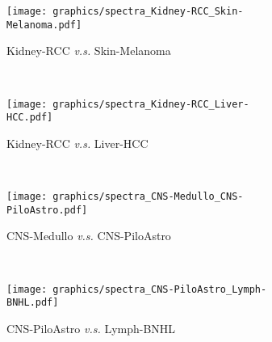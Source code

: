 \begin{figure}[ht!]
    \begin{subfigure}{.5\textwidth}
    \texttt{[image: graphics/spectra\_Kidney-RCC\_Skin-Melanoma.pdf]}
    \caption{Kidney-RCC \textit{v.s.} Skin-Melanoma}
    \label{fig:spectra_kidney_skin}
    \end{subfigure}
    ~
    \begin{subfigure}{.5\textwidth}
    \texttt{[image: graphics/spectra\_Kidney-RCC\_Liver-HCC.pdf]}
    \caption{Kidney-RCC \textit{v.s.} Liver-HCC}
    \label{fig:spectra_kidney_liver}
    \end{subfigure} \\
    \vspace{0.5cm}
    
    \begin{subfigure}{.5\textwidth}
    \texttt{[image: graphics/spectra\_CNS-Medullo\_CNS-PiloAstro.pdf]}
    \caption{CNS-Medullo \textit{v.s.} CNS-PiloAstro}
    \label{fig:spectra_medullo_piloastro}
    \end{subfigure}
    ~
    \begin{subfigure}{.5\textwidth}
    \texttt{[image: graphics/spectra\_CNS-PiloAstro\_Lymph-BNHL.pdf]}
    \caption{CNS-PiloAstro \textit{v.s.} Lymph-BNHL}
    \label{fig:spectra_piloastro_bnhl}
    \end{subfigure} \\
    \vspace{0.5cm}
\caption{}
    \label{fig:paired_spectra}
\end{figure}